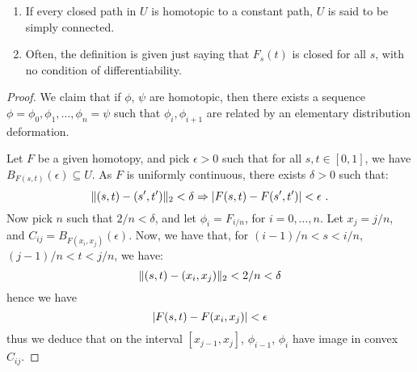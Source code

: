 \begin{remark}
  \begin{enumerate}
  \item If every closed path in $U$ is homotopic to a constant path, $U$ is said to be simply connected.
  \item Often, the definition is given just saying that $F_s(t)$ is closed for all $s$, with no condition of differentiability.
  \end{enumerate}
\end{remark}

\begin{proof}
  We claim that if $\phi$, $\psi$ are homotopic, then there exists a sequence $\phi = \phi_0, \phi_1, \dotsc, \phi_n = \psi$ such that $\phi_i, \phi_{i+1}$ are related by an elementary distribution deformation.

Let $F$ be a given homotopy, and pick $\epsilon > 0$ such that for all $s, t \in [0, 1]$, we have $B_{F(s, t)}(\epsilon) \subseteq U$. 
As $F$ is uniformly continuous, there exists $\delta > 0$ such that:
\[
\norm{(s,t) - (s', t')}_2 < \delta \Rightarrow \abs*{F(s, t) - F(s', t')} < \epsilon \mpunct{.}
\]
Now pick $n$ such that $2/n < \delta$, and let $\phi_i = F_{i/n}$, for $i = 0, \dotsc, n$. Let $x_j = j/n$, and $C_{ij} = B_{F(x_i, x_j)}(\epsilon)$. 
Now, we have that, for $(i-1)/n < s < i/n$, $(j-1)/n < t < j/n$, we have:
\[
\norm{(s, t) - (x_i, x_j)}_2 < 2/n < \delta
\]
hence we have
\[
\abs*{F(s, t) - F(x_i, x_j)} < \epsilon
\]
thus we deduce that on the interval $[x_{j-1}, x_j]$, $\phi_{i-1}$, $\phi_i$ have image in convex $C_{ij}$.
\end{proof}

